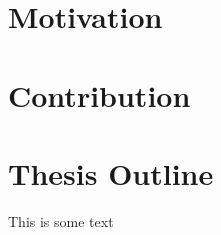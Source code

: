 \documentclass[../thesis.tex]{subfiles}
\begin{document}
\section{Motivation}


\section{Contribution}

\section{Thesis Outline}

This is some text
\end{document}

